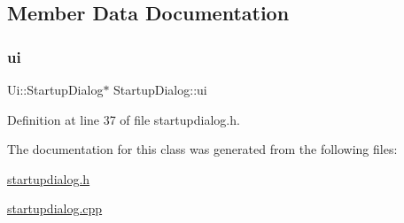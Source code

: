 \subsection{Member Data Documentation}
\mbox{\label{class_startup_dialog_abd18126b373fe2249cfd15cd9cadce5b}} 
\subsubsection{\texorpdfstring{ui}{ui}}
{\footnotesize\ttfamily Ui\+::\+Startup\+Dialog$\ast$ Startup\+Dialog\+::ui\hspace{0.3cm}{\ttfamily [private]}}



Definition at line 37 of file startupdialog.\+h.



The documentation for this class was generated from the following files\+:\begin{DoxyCompactItemize}
\item 
\mbox{\hyperlink{startupdialog_8h}{startupdialog.\+h}}\item 
\mbox{\hyperlink{startupdialog_8cpp}{startupdialog.\+cpp}}\end{DoxyCompactItemize}
